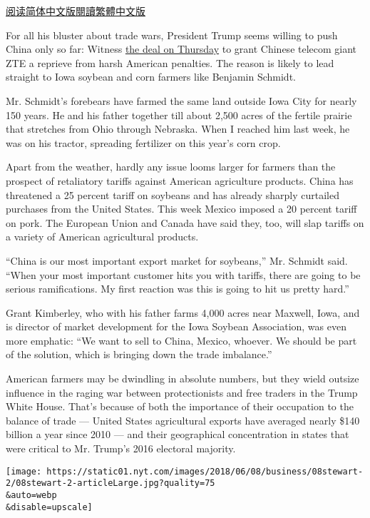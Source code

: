 \href{http://cn.nytimes.com/business/20180608/trump-trade-china-iowa-soybeans/}{阅读简体中文版}\href{http://cn.nytimes.com/business/20180608/trump-trade-china-iowa-soybeans/zh-hant/}{閱讀繁體中文版}

For all his bluster about trade wars, President Trump seems willing to
push China only so far: Witness
\href{https://www.nytimes.com/2018/06/07/business/us-china-zte-deal.html}{the
deal on Thursday} to grant Chinese telecom giant ZTE a reprieve from
harsh American penalties. The reason is likely to lead straight to Iowa
soybean and corn farmers like Benjamin Schmidt.

Mr. Schmidt's forebears have farmed the same land outside Iowa City for
nearly 150 years. He and his father together till about 2,500 acres of
the fertile prairie that stretches from Ohio through Nebraska. When I
reached him last week, he was on his tractor, spreading fertilizer on
this year's corn crop.

Apart from the weather, hardly any issue looms larger for farmers than
the prospect of retaliatory tariffs against American agriculture
products. China has threatened a 25 percent tariff on soybeans and has
already sharply curtailed purchases from the United States. This week
Mexico imposed a 20 percent tariff on pork. The European Union and
Canada have said they, too, will slap tariffs on a variety of American
agricultural products.

``China is our most important export market for soybeans,'' Mr. Schmidt
said. ``When your most important customer hits you with tariffs, there
are going to be serious ramifications. My first reaction was this is
going to hit us pretty hard.''

Grant Kimberley, who with his father farms 4,000 acres near Maxwell,
Iowa, and is director of market development for the Iowa Soybean
Association, was even more emphatic: ``We want to sell to China, Mexico,
whoever. We should be part of the solution, which is bringing down the
trade imbalance.''

American farmers may be dwindling in absolute numbers, but they wield
outsize influence in the raging war between protectionists and free
traders in the Trump White House. That's because of both the importance
of their occupation to the balance of trade --- United States
agricultural exports have averaged nearly \$140 billion a year since
2010 --- and their geographical concentration in states that were
critical to Mr. Trump's 2016 electoral majority.

\texttt{[image: https://static01.nyt.com/images/2018/06/08/business/08stewart-2/08stewart-2-articleLarge.jpg?quality=75\\\&auto=webp\\\&disable=upscale]}


